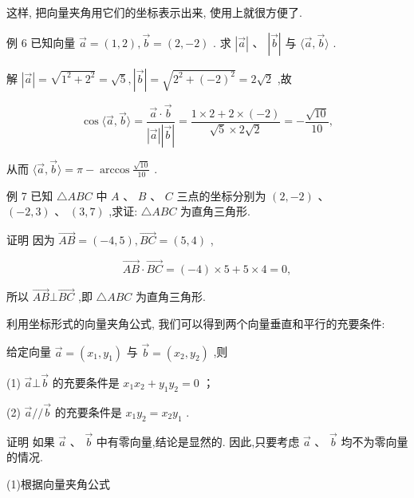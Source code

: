 \documentclass[10pt]{article}
\begin{document}
这样, 把向量夹角用它们的坐标表示出来, 使用上就很方便了.

例 6 已知向量 \(\overrightarrow{a} = \left( {1,2}\right) ,\overrightarrow{b} = \left( {2, - 2}\right)\) . 求 \(\left| \overrightarrow{a}\right| \text{ 、 }\left| \overrightarrow{b}\right|\) 与 \(\langle \overrightarrow{a},\overrightarrow{b}\rangle\) .

解 \(\left| \overrightarrow{a}\right|  = \sqrt{{1}^{2} + {2}^{2}} = \sqrt{5},\left| \overrightarrow{b}\right|  = \sqrt{{2}^{2} + {\left( -2\right) }^{2}} = 2\sqrt{2}\) ,故

\[
\cos \langle \overrightarrow{a},\overrightarrow{b}\rangle  = \frac{\overrightarrow{a} \cdot  \overrightarrow{b}}{\left| \overrightarrow{a}\right| \left| \overrightarrow{b}\right| } = \frac{1 \times  2 + 2 \times  \left( {-2}\right) }{\sqrt{5} \times  2\sqrt{2}} =  - \frac{\sqrt{10}}{10},
\]

从而 \(\langle \overrightarrow{a},\overrightarrow{b}\rangle  = \pi  - \arccos \frac{\sqrt{10}}{10}\) .

例 7 已知 \(\bigtriangleup {ABC}\) 中 \(A\text{ 、 }B\text{ 、 }C\) 三点的坐标分别为 \(\left( {2, - 2}\right)\) 、 \(\left( {-2,3}\right) \text{ 、 }\left( {3,7}\right)\) ,求证: \(\bigtriangleup {ABC}\) 为直角三角形.

证明 因为 \(\overrightarrow{AB} = \left( {-4,5}\right) ,\overrightarrow{BC} = \left( {5,4}\right)\) ,

\[
\overrightarrow{AB} \cdot  \overrightarrow{BC} = \left( {-4}\right)  \times  5 + 5 \times  4 = 0,
\]

所以 \(\overrightarrow{AB} \bot  \overrightarrow{BC}\) ,即 \(\bigtriangleup {ABC}\) 为直角三角形.

利用坐标形式的向量夹角公式, 我们可以得到两个向量垂直和平行的充要条件:

给定向量 \(\overrightarrow{a} = \left( {{x}_{1},{y}_{1}}\right)\) 与 \(\overrightarrow{b} = \left( {{x}_{2},{y}_{2}}\right)\) ,则

(1) \(\overrightarrow{a}\bot \overrightarrow{b}\) 的充要条件是 \({x}_{1}{x}_{2} + {y}_{1}{y}_{2} = 0\) ；

(2) \(\overrightarrow{a}//\overrightarrow{b}\) 的充要条件是 \({x}_{1}{y}_{2} = {x}_{2}{y}_{1}\) .

证明 如果 \(\overrightarrow{a}\text{ 、 }\overrightarrow{b}\) 中有零向量,结论是显然的. 因此,只要考虑 \(\overrightarrow{a}\text{ 、 }\overrightarrow{b}\) 均不为零向量的情况.

(1)根据向量夹角公式
\end{document}
